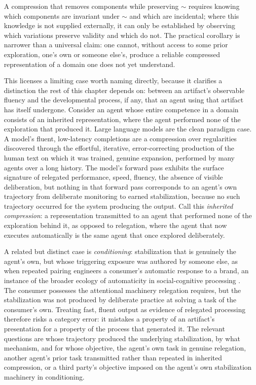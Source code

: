 A compression that removes components while preserving $\sim$ requires knowing which components are invariant under $\sim$ and which are incidental; where this knowledge is not supplied externally, it can only be established by observing which variations preserve validity and which do not. The practical corollary is narrower than a universal claim: one cannot, without access to some prior exploration, one's own or someone else's, produce a reliable compressed representation of a domain one does not yet understand.

This licenses a limiting case worth naming directly, because it clarifies a distinction the rest of this chapter depends on: between an artifact's observable fluency and the developmental process, if any, that an agent using that artifact has itself undergone. Consider an agent whose entire competence in a domain consists of an inherited representation, where the agent performed none of the exploration that produced it. Large language models are the clean paradigm case. A model's fluent, low-latency completions are a compression over regularities discovered through the effortful, iterative, error-correcting production of the human text on which it was trained, genuine expansion, performed by many agents over a long history. The model's forward pass exhibits the surface signature of relegated performance, speed, fluency, the absence of visible deliberation, but nothing in that forward pass corresponds to an agent's own trajectory from deliberate monitoring to earned stabilization, because no such trajectory occurred for the system producing the output. Call this \emph{inherited compression}: a representation transmitted to an agent that performed none of the exploration behind it, as opposed to relegation, where the agent that now executes automatically is the same agent that once explored deliberately.

A related but distinct case is \emph{conditioning}: stabilization that is genuinely the agent's own, but whose triggering exposure was authored by someone else, as when repeated pairing engineers a consumer's automatic response to a brand, an instance of the broader ecology of automaticity in social-cognitive processing \cite{bargh1992,bargh2012}. The consumer possesses the attentional machinery relegation requires, but the stabilization was not produced by deliberate practice at solving a task of the consumer's own. Treating fast, fluent output as evidence of relegated processing therefore risks a category error: it mistakes a property of an artifact's presentation for a property of the process that generated it. The relevant questions are whose trajectory produced the underlying stabilization, by what mechanism, and for whose objective, the agent's own task in genuine relegation, another agent's prior task transmitted rather than repeated in inherited compression, or a third party's objective imposed on the agent's own stabilization machinery in conditioning.

